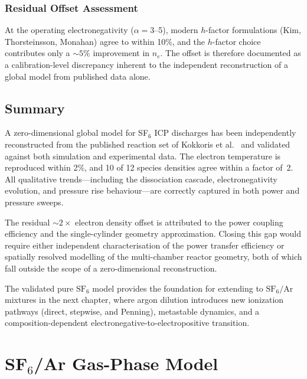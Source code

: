 \documentclass[11pt,a4paper]{report}
\newcommand{\SFsix}{\mathrm{SF}_6}
\newcommand{\Ar}{\mathrm{Ar}}
\begin{document}
\subsection{Residual Offset Assessment}
\label{sec:pure_residual}

At the operating electronegativity ($\alpha = 3$--5), modern $h$-factor formulations (Kim, Thorsteinsson, Monahan) agree to within 10\%, and the $h$-factor choice contributes only a ${\sim}5\%$ improvement in $n_e$.  The offset is therefore documented as a calibration-level discrepancy inherent to the independent reconstruction of a global model from published data alone.

\section{Summary}
\label{sec:pure_summary}

A zero-dimensional global model for SF$_6$ ICP discharges has been independently reconstructed from the published reaction set of Kokkoris et al.~\cite{Kokkoris2009} and validated against both simulation and experimental data.  The electron temperature is reproduced within 2\%, and 10 of 12 species densities agree within a factor of~2.  All qualitative trends---including the dissociation cascade, electronegativity evolution, and pressure rise behaviour---are correctly captured in both power and pressure sweeps.

The residual ${\sim}2\times$ electron density offset is attributed to the power coupling efficiency and the single-cylinder geometry approximation.  Closing this gap would require either independent characterisation of the power transfer efficiency or spatially resolved modelling of the multi-chamber reactor geometry, both of which fall outside the scope of a zero-dimensional reconstruction.

The validated pure $\SFsix$ model provides the foundation for extending to $\SFsix/\Ar$ mixtures in the next chapter, where argon dilution introduces new ionization pathways (direct, stepwise, and Penning), metastable dynamics, and a composition-dependent electronegative-to-electropositive transition.


\chapter{SF\texorpdfstring{$_6$}{6}/Ar Gas-Phase Model}
\label{ch:sf6ar_gasphase}
\end{document}
